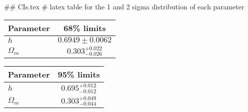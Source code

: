 ## CIs.tex
# latex table for the 1 and 2 sigma distribution of each parameter

\begin{tabular} { l  c}
 Parameter &  68\% limits\\
\hline
{\boldmath$h              $} & $0.6949\pm 0.0062          $\\
{\boldmath$\Omega_m       $} & $0.303^{+0.022}_{-0.026}   $\\
\hline
\end{tabular}

\begin{tabular} { l  c}
 Parameter &  95\% limits\\
\hline
{\boldmath$h              $} & $0.695^{+0.012}_{-0.012}   $\\
{\boldmath$\Omega_m       $} & $0.303^{+0.049}_{-0.044}   $\\
\hline
\end{tabular}
